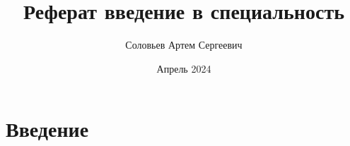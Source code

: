 \documentclass[14pt,a4paper]{extarticle}
\title{Реферат введение в специальность}
\author{Соловьев Артем Сергеевич}
\date{Апрель 2024}
\begin{document}
	
	
	{ \fontsize{14 pt}{10pt} \selectfont
	
	}
	
	\section{Введение}
	
	
		
	
	
\end{document}
